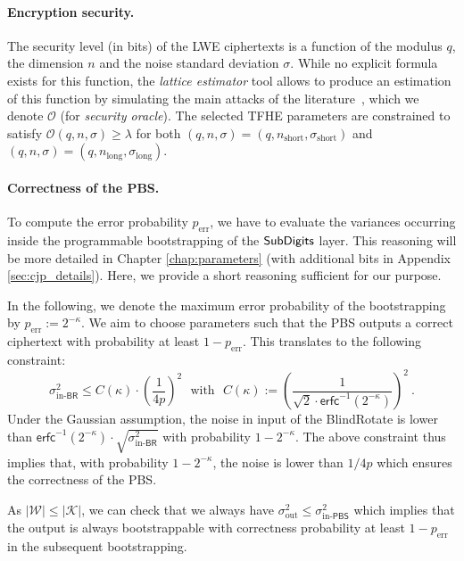 \paragraph{Encryption security.} 
The security level (in bits) of the LWE ciphertexts is a function of the modulus $q$, the dimension $n$ and the noise standard deviation $\sigma$. While no explicit formula exists for this function, the \emph{lattice estimator} tool allows to produce an estimation of this function by simulating the main attacks of the literature~\cite{lattice-estimator}, which we denote $\mathcal{O}$ (for \emph{security oracle}). The selected TFHE parameters are constrained to satisfy $\mathcal{O}(q,n,\sigma) \geq \lambda$ for both $(q,n,\sigma) = (q,n_{\text{short}},\sigma_{\text{short}})$ and $(q,n,\sigma) = (q,n_{\text{long}},\sigma_{\text{long}})$.



\paragraph{Correctness of the PBS.} To compute the error probability $p_{\text{err}}$, we have to evaluate the variances occurring inside the programmable bootstrapping of the $\text{\textsf{SubDigits}}$ layer. This reasoning will be more detailed in Chapter \ref{chap:parameters} (with additional bits in Appendix \ref{sec:cjp_details}). Here, we provide a short reasoning sufficient for our purpose.


In the following, we denote the maximum error probability of the bootstrapping by $p_{\text{err}} := 2^{-\kappa}$. We aim to choose parameters such that the PBS outputs a correct ciphertext with probability at least $1-p_{\text{err}}$. This translates to the following constraint:
$$\sigma^2_{\text{in-}\textsf{BR}} \leq  C(\kappa) \cdot \left(\frac1{4p}\right)^2 ~~~\text{with}~~~C(\kappa) := \left(\frac{1}{\sqrt{2} \cdot \mathsf{erfc}^{-1}(2^{-\kappa})}\right)^2 ~.$$
Under the Gaussian assumption, the noise in input of the \textsf{BlindRotate} is lower than $\mathsf{erfc}^{-1}(2^{-\kappa}) \cdot \sqrt{\sigma^2_{\text{in-}\textsf{BR}}}$ with probability $1-2^{-\kappa}$. The above constraint thus implies that, with probability $1-2^{-\kappa}$, the noise is lower than $1/{4p}$ which ensures the correctness of the PBS. 

As $|\mathcal W| \leq |\mathcal K|$, we can check that we always have $\sigma^2_{\text{out}} \leq \sigma^2_{\text{in-}\textsf{PBS}}$ which implies that the output is always bootstrappable with correctness probability at least $1-p_{\text{err}}$ in the subsequent bootstrapping.


